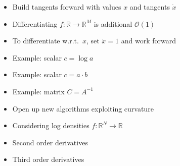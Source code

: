 \documentclass[10pt]{report}
\begin{document}
\begin{itemize}
\item Build tangents forward with values $x$ and tangents $\dot{x}$
\item Differentiating $f:\mathbb{R} \rightarrow \mathbb{R}^M$ is additional $\mathcal{O}(1)$
\item To differentiate w.r.t.\ $x$, set $\dot{x} = 1$ and work forward
\item Example:  scalar $c = \log a$
\item Example: scalar $c = a \cdot b$
\item Example: matrix $C = A^{-1}$
\end{itemize}

\begin{itemize}
\item Open up new algorithms exploiting curvature
\item Considering log densities $f :\mathbb{R}^N \rightarrow \mathbb{R}$
\item Second order derivatives
\item Third order derivatives
\end{itemize}

\end{document}
